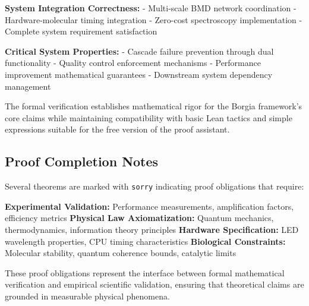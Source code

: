 \textbf{System Integration Correctness:}
- Multi-scale BMD network coordination
- Hardware-molecular timing integration  
- Zero-cost spectroscopy implementation
- Complete system requirement satisfaction

\textbf{Critical System Properties:}
- Cascade failure prevention through dual functionality
- Quality control enforcement mechanisms
- Performance improvement mathematical guarantees
- Downstream system dependency management

The formal verification establishes mathematical rigor for the Borgia framework's core claims while maintaining compatibility with basic Lean tactics and simple expressions suitable for the free version of the proof assistant.

\subsection{Proof Completion Notes}

Several theorems are marked with \texttt{sorry} indicating proof obligations that require:

\textbf{Experimental Validation:} Performance measurements, amplification factors, efficiency metrics
\textbf{Physical Law Axiomatization:} Quantum mechanics, thermodynamics, information theory principles  
\textbf{Hardware Specification:} LED wavelength properties, CPU timing characteristics
\textbf{Biological Constraints:} Molecular stability, quantum coherence bounds, catalytic limits

These proof obligations represent the interface between formal mathematical verification and empirical scientific validation, ensuring that theoretical claims are grounded in measurable physical phenomena.
